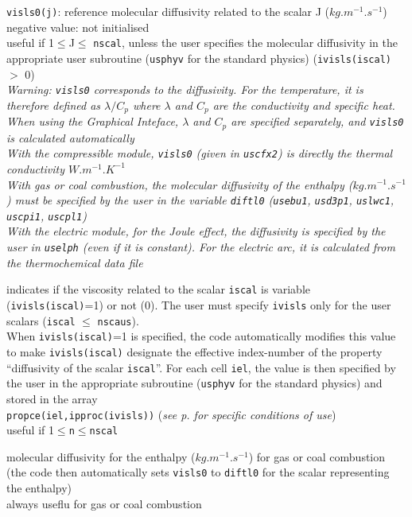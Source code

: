 {{\tt visls0(j)}: reference molecular diffusivity related to the scalar J
($kg.m^{-1}.s^{-1}$)\\
negative value: not initialised\\
useful if 1$\leqslant$J$\leqslant$ {\tt nscal}, unless the user specifies the
molecular diffusivity in the appropriate user subroutine (\texttt{usphyv} for
the standard physics) ({\tt ivisls(iscal)} $>$ 0)\\
{\em Warning: {\tt visls0} corresponds to the diffusivity. For the temperature, it is
therefore defined as $\lambda/C_p$ where $\lambda$ and $C_p$ are the
conductivity and specific heat. When using the Graphical Inteface, $\lambda$ and
$C_p$ are specified separately, and {\tt visls0} is calculated automatically\\
With the compressible module, {\tt visls0} (given in \texttt{uscfx2}) is directly the
thermal conductivity $W.m^{-1}.K^{-1}$\\
With gas or coal combustion, the molecular diffusivity of the enthalpy
($kg.m^{-1}.s^{-1}$) must be specified by the user in the variable {\tt diftl0}
(\texttt{usebu1}, \texttt{usd3p1}, \texttt{uslwc1}, \texttt{uscpi1}, \texttt{uscpl1})\\
With the electric module, for the Joule effect, the diffusivity is specified by
the user in \texttt{uselph} (even if it is constant). For the electric arc, it
is calculated from the thermochemical data file}}

{indicates if the viscosity related to the scalar {\tt iscal} is variable
({\tt ivisls(iscal)}=1) or not (0). The user must specify {\tt ivisls} only for the
user scalars ({\tt iscal} $\leqslant$ {\tt nscaus}).\\
When {\tt ivisls(iscal)}=1 is specified, the code automatically modifies this value to
make {\tt ivisls(iscal)} designate the effective index-number of the property
``diffusivity of the scalar {\tt iscal}''. For each cell {\tt iel}, the value
is then specified by the user in the appropriate subroutine
(\texttt{usphyv} for the standard physics) and stored in the array\\
{\tt propce(iel,ipproc(ivisls))}
({\em see p.\pageref{prg_propvar} for specific conditions of use})\\
useful if 1$\leqslant${\tt n}$\leqslant${\tt nscal}}


{molecular diffusivity for the enthalpy ($kg.m^{-1}.s^{-1}$) for gas or coal
combustion (the code then automatically sets {\tt visls0} to {\tt diftl0} for the scalar
representing the enthalpy)\\
always useflu for gas or coal combustion}

